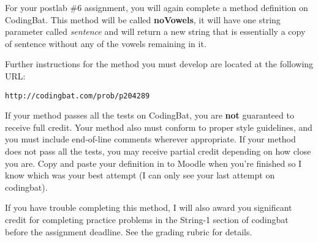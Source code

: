 For your postlab \#6 assignment, you will again complete a method definition on CodingBat. This method will be called \textbf{noVowels}, it will have one string parameter called \textit{sentence} and will return a new string that is essentially a copy of sentence without any of the vowels remaining in it.

Further instructions for the method you must develop are located at the following URL:

\begin{verbatim}
http://codingbat.com/prob/p204289
\end{verbatim}

If your method passes all the tests on CodingBat, you are \textbf{not} guaranteed to receive full credit. Your method also must conform to proper style guidelines, and you must include end-of-line comments wherever appropriate. If your method does not pass all the tests, you may receive partial credit depending on how close you are. Copy and paste your definition in to Moodle when you're finished so I know which was your best attempt (I can only see your last attempt on codingbat). 

If you have trouble completing this method, I will also award you significant credit for completing practice problems in the String-1 section of codingbat before the assignment deadline. See the grading rubric for details.
